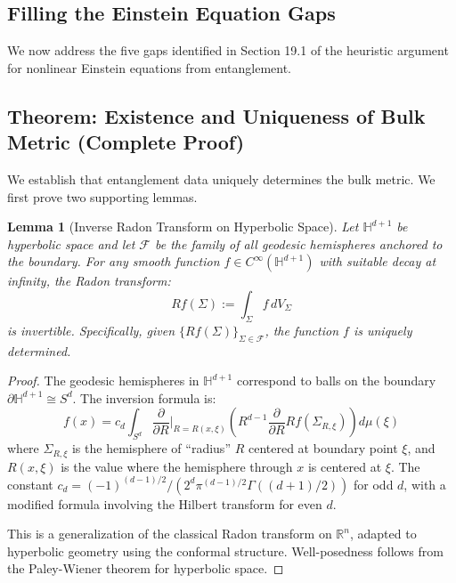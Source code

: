 \documentclass[12pt,a4paper]{article}
\newtheorem{lemma}[theorem]{Lemma}
\begin{document}
\subsection{Filling the Einstein Equation Gaps}

We now address the five gaps identified in Section 19.1 of the heuristic argument for nonlinear Einstein equations from entanglement.

\subsection{Theorem: Existence and Uniqueness of Bulk Metric (Complete Proof)}

We establish that entanglement data uniquely determines the bulk metric. We first prove two supporting lemmas.

\begin{lemma}[Inverse Radon Transform on Hyperbolic Space]\label{lem:radon-hyperbolic}
Let $\mathbb{H}^{d+1}$ be hyperbolic space and let $\mathcal{F}$ be the family of all geodesic hemispheres anchored to the boundary. For any smooth function $f \in C^\infty(\mathbb{H}^{d+1})$ with suitable decay at infinity, the Radon transform:
\begin{equation}
Rf(\Sigma) := \int_\Sigma f \, dV_\Sigma
\end{equation}
is invertible. Specifically, given $\{Rf(\Sigma)\}_{\Sigma \in \mathcal{F}}$, the function $f$ is uniquely determined.
\end{lemma}

\begin{proof}
The geodesic hemispheres in $\mathbb{H}^{d+1}$ correspond to balls on the boundary $\partial\mathbb{H}^{d+1} \cong S^d$. The inversion formula is:
\begin{equation}
f(x) = c_d \int_{S^d} \frac{\partial}{\partial R}\Big|_{R=R(x,\xi)} \left( R^{d-1} \frac{\partial}{\partial R} Rf(\Sigma_{R,\xi}) \right) d\mu(\xi)
\end{equation}
where $\Sigma_{R,\xi}$ is the hemisphere of ``radius'' $R$ centered at boundary point $\xi$, and $R(x,\xi)$ is the value where the hemisphere through $x$ is centered at $\xi$. The constant $c_d = (-1)^{(d-1)/2}/(2^d \pi^{(d-1)/2} \Gamma((d+1)/2))$ for odd $d$, with a modified formula involving the Hilbert transform for even $d$.

This is a generalization of the classical Radon transform on $\mathbb{R}^n$, adapted to hyperbolic geometry using the conformal structure. Well-posedness follows from the Paley-Wiener theorem for hyperbolic space.
\end{proof}
\end{document}
